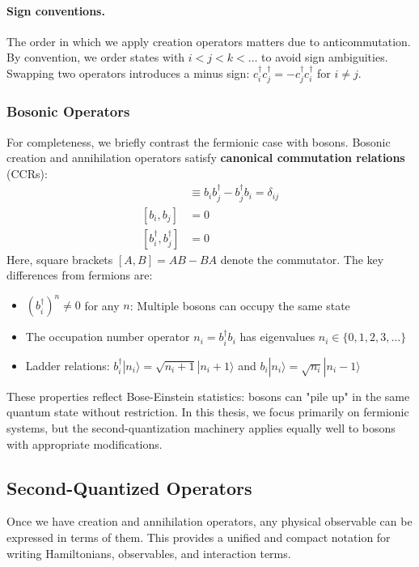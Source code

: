 \documentclass[12pt,oneside,openright]{report}
\theoremstyle{definition}
\theoremstyle{plain}
\theoremstyle{remark}
\begin{document}
\paragraph{Sign conventions.}
The order in which we apply creation operators matters due to anticommutation. By convention, 
we order states with $i<j<k<\ldots$ to avoid sign ambiguities. Swapping two operators introduces 
a minus sign: $c_i^\dagger c_j^\dagger = -c_j^\dagger c_i^\dagger$ for $i\neq j$.

\subsubsection{Bosonic Operators}
\label{subsubsec:bosonic_operators}
For completeness, we briefly contrast the fermionic case with bosons. Bosonic creation and 
annihilation operators satisfy \textbf{canonical commutation relations} (CCRs):
\begin{align}
[b_i, b_j^\dagger] &\equiv b_i b_j^\dagger - b_j^\dagger b_i = \delta_{ij} \\
[b_i, b_j] &= 0 \\
[b_i^\dagger, b_j^\dagger] &= 0
\end{align}
Here, square brackets $[A,B] = AB - BA$ denote the commutator. The key differences from fermions are:
\begin{itemize}
\item $(b_i^\dagger)^n \neq 0$ for any $n$: Multiple bosons can occupy the same state
\item The occupation number operator $n_i = b_i^\dagger b_i$ has eigenvalues $n_i \in \{0, 1, 2, 3, \ldots\}$
\item Ladder relations: $b_i^\dagger |n_i\rangle = \sqrt{n_i+1} |n_i+1\rangle$ and 
$b_i |n_i\rangle = \sqrt{n_i} |n_i-1\rangle$
\end{itemize}
These properties reflect Bose-Einstein statistics: bosons can "pile up" in the same quantum state 
without restriction. In this thesis, we focus primarily on fermionic systems, but the second-quantization 
machinery applies equally well to bosons with appropriate modifications.

\subsection{Second-Quantized Operators}
\label{subsec:second_quant_operators}
Once we have creation and annihilation operators, any physical observable can be expressed 
in terms of them. This provides a unified and compact notation for writing Hamiltonians, 
observables, and interaction terms.
\end{document}
